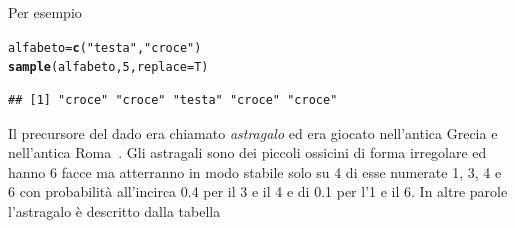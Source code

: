 \documentclass[onecolumn,12pt]{book}\usepackage[]{graphicx}\usepackage[]{color}
\makeatletter
\newcommand{\hlnum}[1]{\textcolor[rgb]{0.686,0.059,0.569}{#1}}%
\newcommand{\hlstr}[1]{\textcolor[rgb]{0.192,0.494,0.8}{#1}}%
\newcommand{\hlstd}[1]{\textcolor[rgb]{0.345,0.345,0.345}{#1}}%
\newcommand{\hlkwb}[1]{\textcolor[rgb]{0.69,0.353,0.396}{#1}}%
\newcommand{\hlkwc}[1]{\textcolor[rgb]{0.333,0.667,0.333}{#1}}%
\newcommand{\hlkwd}[1]{\textcolor[rgb]{0.737,0.353,0.396}{\textbf{#1}}}%
\newenvironment{kframe}{%
 \def\at@end@of@kframe{}%
 \ifinner\ifhmode%
  \def\at@end@of@kframe{\end{minipage}}%
  \begin{minipage}{\columnwidth}%
 \fi\fi%
 \def\FrameCommand##1{\hskip\@totalleftmargin \hskip-\fboxsep
 \colorbox{shadecolor}{##1}\hskip-\fboxsep
     \hskip-\linewidth \hskip-\@totalleftmargin \hskip\columnwidth}%
 \MakeFramed {\advance\hsize-\width
   \@totalleftmargin\z@ \linewidth\hsize
   \@setminipage}}%
 {\par\unskip\endMakeFramed%
 \at@end@of@kframe}
\newenvironment{knitrout}{}{} %
\makeatother
\begin{document}
Per esempio
\begin{knitrout}
\color{fgcolor}\begin{kframe}
\begin{alltt}
\hlstd{alfabeto}\hlkwb{=}\hlkwd{c}\hlstd{(}\hlstr{"testa"}\hlstd{,}\hlstr{"croce"}\hlstd{)}
\hlkwd{sample}\hlstd{(alfabeto,}\hlnum{5}\hlstd{,}\hlkwc{replace}\hlstd{=T)}
\end{alltt}
\begin{verbatim}
## [1] "croce" "croce" "testa" "croce" "croce"
\end{verbatim}
\end{kframe}
\end{knitrout}
 

Il precursore  del dado era chiamato \emph{astragalo} ed era giocato nell'antica Grecia e nell'antica Roma~\cite{david}.
Gli  astragali sono dei piccoli ossicini di forma irregolare ed hanno 6 facce ma atterranno in  modo stabile solo su 4 di esse numerate 1, 3, 4 e 6  con probabilit\`a all'incirca 0.4 per il 3 e il 4  e di 0.1 per l'1 e il 6. In altre parole l'astragalo \`e descritto dalla tabella
\end{document}
